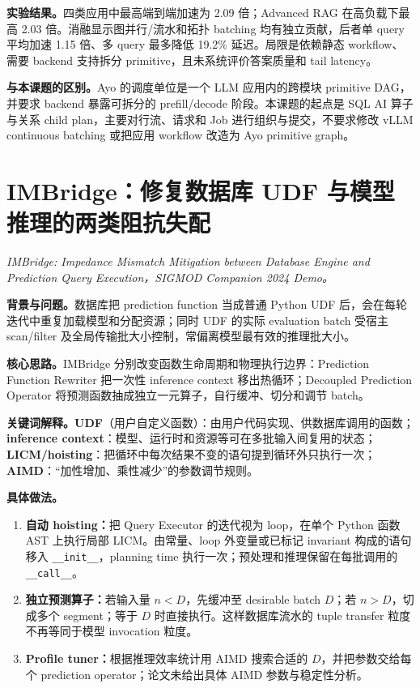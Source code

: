 \documentclass[10pt,a4paper]{ctexart}
\let\digestoriginalsection\section
\renewcommand{\section}{\Needspace{7\baselineskip}\digestoriginalsection}
\newcommand{\paperinfo}[1]{\textit{#1}\par}
\newcommand{\field}[1]{\par\noindent\textbf{#1。}\hspace{0.25em}}
\begin{document}
\field{实验结果}四类应用中最高端到端加速为 2.09 倍；Advanced RAG 在高负载下最高 2.03 倍。消融显示图并行/流水和拓扑 batching 均有独立贡献，后者单 query 平均加速 1.15 倍、多 query 最多降低 19.2\% 延迟。局限是依赖静态 workflow、需要 backend 支持拆分 primitive，且未系统评价答案质量和 tail latency。

\field{与本课题的区别}Ayo 的调度单位是一个 LLM 应用内的跨模块 primitive DAG，并要求 backend 暴露可拆分的 prefill/decode 阶段。本课题的起点是 SQL AI 算子与关系 child plan，主要对行流、请求和 Job 进行组织与提交，不要求修改 vLLM continuous batching 或把应用 workflow 改造为 Ayo primitive graph。

\section{IMBridge：修复数据库 UDF 与模型推理的两类阻抗失配}
\paperinfo{IMBridge: Impedance Mismatch Mitigation between Database Engine and Prediction Query Execution，SIGMOD Companion 2024 Demo。}

\field{背景与问题}数据库把 prediction function 当成普通 Python UDF 后，会在每轮迭代中重复加载模型和分配资源；同时 UDF 的实际 evaluation batch 受宿主 scan/filter 及全局传输批大小控制，常偏离模型最有效的推理批大小。

\field{核心思路}IMBridge 分别改变函数生命周期和物理执行边界：Prediction Function Rewriter 把一次性 inference context 移出热循环；Decoupled Prediction Operator 将预测函数抽成独立一元算子，自行缓冲、切分和调节 batch。

\field{关键词解释}\textbf{UDF}（用户自定义函数）：由用户代码实现、供数据库调用的函数；\textbf{inference context}：模型、运行时和资源等可在多批输入间复用的状态；\textbf{LICM/hoisting}：把循环中每次结果不变的语句提到循环外只执行一次；\textbf{AIMD}：“加性增加、乘性减少”的参数调节规则。

\field{具体做法}
\begin{enumerate}
  \item \textbf{自动 hoisting：}把 Query Executor 的迭代视为 loop，在单个 Python 函数 AST 上执行局部 LICM。由常量、loop 外变量或已标记 invariant 构成的语句移入 \texttt{\_\_init\_\_}，planning time 执行一次；预处理和推理保留在每批调用的 \texttt{\_\_call\_\_}。
  \item \textbf{独立预测算子：}若输入量 $n<D$，先缓冲至 desirable batch $D$；若 $n>D$，切成多个 segment；等于 $D$ 时直接执行。这样数据库流水的 tuple transfer 粒度不再等同于模型 invocation 粒度。
  \item \textbf{Profile tuner：}根据推理效率统计用 AIMD 搜索合适的 $D$，并把参数交给每个 prediction operator；论文未给出具体 AIMD 参数与稳定性分析。
\end{enumerate}
\end{document}

